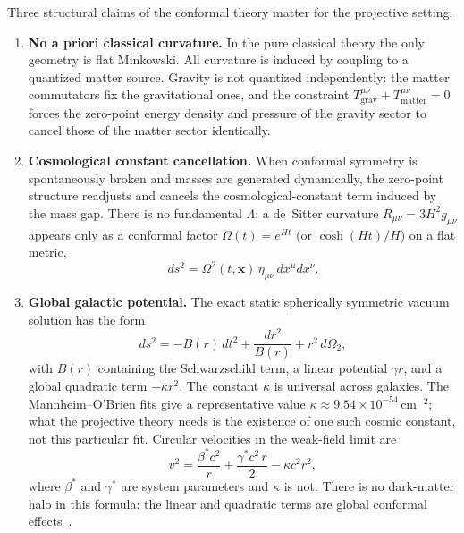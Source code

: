 \documentclass{article}
\theoremstyle{definition}
\begin{document}
Three structural claims of the conformal theory matter for the projective
setting.

\begin{enumerate}[label=\arabic*.]
  \item \textbf{No a priori classical curvature.}
        In the pure classical theory the only geometry is flat Minkowski.
        All curvature is induced by coupling to a quantized matter source.
        Gravity is not quantized independently: the matter commutators fix
        the gravitational ones, and the constraint
        \(T^{\mu\nu}_{\mathrm{grav}}+T^{\mu\nu}_{\mathrm{matter}}=0\)
        forces the zero-point energy density and pressure of the gravity
        sector to cancel those of the matter sector identically.
  \item \textbf{Cosmological constant cancellation.}
        When conformal symmetry is spontaneously broken and masses are
        generated dynamically, the zero-point structure readjusts and cancels
        the cosmological-constant term induced by the mass gap.  There is no
        fundamental \(\Lambda\); a de~Sitter curvature
        \(R_{\mu\nu}=3H^2 g_{\mu\nu}\) appears only as a conformal factor
        \(\Omega(t)=e^{Ht}\) (or \(\cosh(Ht)/H\)) on a flat metric,
        \[
          ds^2=\Omega^2(t,\mathbf{x})\,\eta_{\mu\nu}\,dx^\mu dx^\nu.
        \]
  \item \textbf{Global galactic potential.}
        The exact static spherically symmetric vacuum solution has the form
        \[
          ds^2=-B(r)\,dt^2+\frac{dr^2}{B(r)}+r^2\,d\Omega_2,
        \]
        with \(B(r)\) containing the Schwarzschild term, a linear potential
        \(\gamma r\), and a global quadratic term \(-\kappa r^2\).  The constant
        \(\kappa\) is universal across galaxies.  The Mannheim--O'Brien fits
        give a representative value
        \(\kappa\approx 9.54\times 10^{-54}\,\mathrm{cm}^{-2}\);
        what the projective theory needs is the existence of one such cosmic
        constant, not this particular fit.  Circular velocities in the
        weak-field limit are
        \[
          v^2
            = \frac{\beta^{*}c^{2}}{r}
            + \frac{\gamma^{*}c^{2}\,r}{2}
            - \kappa c^{2} r^{2},
        \]
        where \(\beta^{*}\) and \(\gamma^{*}\) are system parameters and
        \(\kappa\) is not.  There is no dark-matter halo in this formula:
        the linear and quadratic terms are global conformal
        effects~\cite{Mannheim2011,TonpaConf}.
\end{enumerate}
\end{document}
